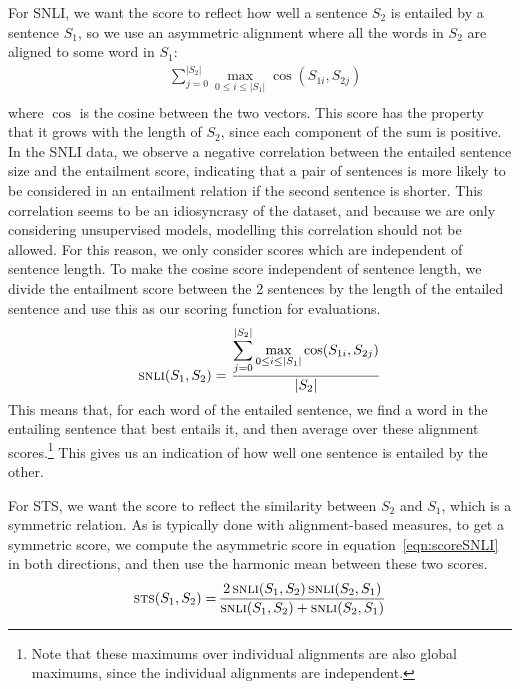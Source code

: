 \documentclass[11pt,a4paper]{article}
\DeclareMathOperator*{\SNLI}{\mbox{\sc snli}}
\DeclareMathOperator*{\STS}{\mbox{\sc sts}}
\begin{document}
For SNLI, we want the score to reflect how well a sentence $S_{2}$ is entailed
by a sentence $S_{1}$, so we use an asymmetric alignment where all the words in
$S_{2}$ are aligned to some word in $S_{1}$:
\vspace{-0.5ex}
\begin{align*}
&\sum_{j=0}^{|S_{2}|} \max_{0 \leq i \leq |S_{1}|} \cos(S_{1i}, S_{2j})
\\[-4ex]\nonumber
\end{align*}
where $\cos$ is the cosine between the two vectors.  
This score has the property that it grows with the length of $S_{2}$, since
each component of the sum is positive.  In the SNLI data, we observe a
negative correlation between the entailed sentence size and the entailment
score, indicating that a pair of sentences is more likely to be considered in
an entailment relation if the second sentence is shorter.  This
correlation seems to be an idiosyncrasy of the dataset, and because we are only
considering unsupervised models, modelling this correlation should
not be allowed.  For this reason, we only consider scores which are
independent of sentence length.  To make the cosine score independent of
sentence length, we divide 
the entailment score between the 2 sentences by the length of the entailed
sentence and use this as our scoring function for evaluations.
\vspace{-0.5ex}
\begin{align}
  \SNLI(S_{1}, S_{2}) =~&
  \frac{\displaystyle \sum_{j=0}^{|S_{2}|} \max_{0 \leq i \leq |S_{1}|} \cos(S_{1i}, S_{2j})}{|S_{2}|}
  \label{eqn:scoreSNLI}
\\[-4ex]\nonumber
\end{align}
This means that, for each word of the entailed sentence, we find a word
in the entailing sentence that best entails it, and then average over these
alignment scores.\footnote{Note that these maximums over individual alignments
  are also global maximums, since the individual alignments are independent.}
This gives us an indication of how well one sentence is entailed by the other.

For STS, we want the score to reflect the similarity between $S_{2}$ and
$S_{1}$, which is a symmetric relation.  As is typically done with
alignment-based measures, to get a symmetric score, we compute the asymmetric
score in equation~\ref{eqn:scoreSNLI} in both directions, and then use the harmonic mean
between these two scores.
\vspace{-0.5ex}
\begin{align}
  \STS(S_{1}, S_{2}) =\,&
  \frac{ 2 \SNLI(S_{1}, S_{2}) \SNLI(S_{2}, S_{1}) }{
    \SNLI(S_{1}, S_{2}) + \SNLI(S_{2}, S_{1}) }
  \label{eqn:scoreSTS}
\\[-4ex]\nonumber
\end{align}
\end{document}
